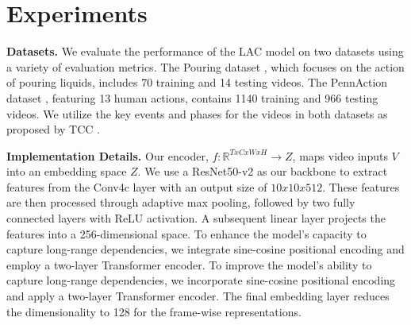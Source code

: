 
\section{Experiments}

\textbf{Datasets.} We evaluate the performance of the LAC model on two datasets using a variety of evaluation metrics. The Pouring dataset \cite{2017_tcn}, which focuses on the action of pouring liquids, includes 70 training and 14 testing videos. The PennAction dataset \cite{2013_pennaction}, featuring 13 human actions, contains 1140 training and 966 testing videos. We utilize the key events and phases for the videos in both datasets as proposed by TCC \cite{2019_tcc}.


\noindent \textbf{Implementation Details.} 
Our encoder, \(f: \mathbb{R}^{TxCxWxH} \to Z\), maps video inputs $V$ into an embedding space \(Z\). We use a ResNet50-v2 \cite{2015_resnet} as our backbone to extract features from the Conv4c layer with an output size of \(10x10x512\).
These features are then processed through adaptive max pooling, followed by two fully connected layers with ReLU activation.
A subsequent linear layer projects the features into a 256-dimensional space. 
To enhance the model’s capacity to capture long-range dependencies, we integrate sine-cosine positional encoding and employ a two-layer Transformer encoder. 
 To improve the model’s ability to capture long-range dependencies, we incorporate sine-cosine positional encoding and apply a two-layer Transformer encoder. 
 The final embedding layer reduces the dimensionality to 128 for the frame-wise representations.

